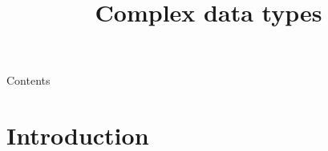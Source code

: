 
\newcommand{\topic}{
	Complex data types
}

\title{\topic}
\supertitle{\course}
\date{}



\maketitle

\begin{frame}{Contents}
	\tableofcontents
\end{frame}

\section{Introduction}

